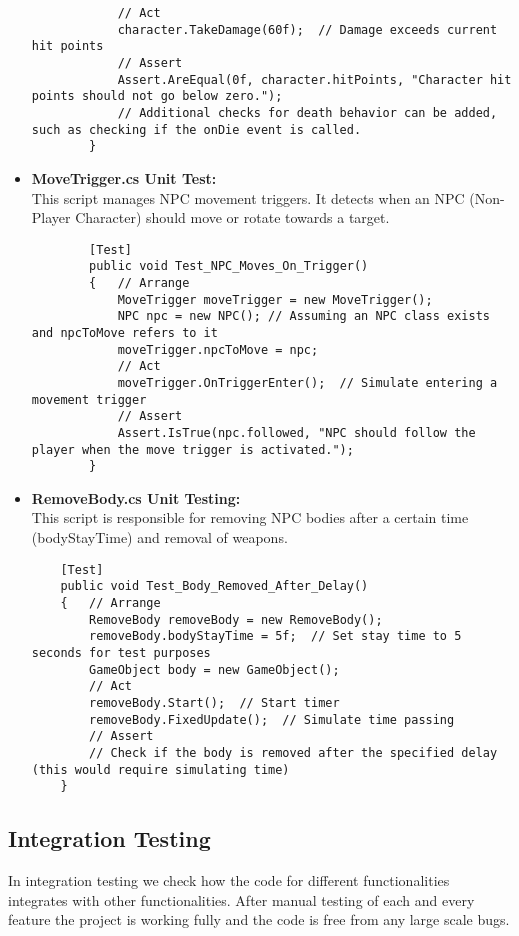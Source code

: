\begin{itemize}
\begin{lstlisting}
			// Act
			character.TakeDamage(60f);  // Damage exceeds current hit points
			// Assert
			Assert.AreEqual(0f, character.hitPoints, "Character hit points should not go below zero.");
			// Additional checks for death behavior can be added, such as checking if the onDie event is called.
		}
	\end{lstlisting}
	\item \textbf{ MoveTrigger.cs Unit Test:}
	\\
	This script manages NPC movement triggers. It detects when an NPC (Non-Player Character) should move or rotate towards a target.
	\begin{lstlisting}
		[Test]
		public void Test_NPC_Moves_On_Trigger()
		{   // Arrange
			MoveTrigger moveTrigger = new MoveTrigger();
			NPC npc = new NPC(); // Assuming an NPC class exists and npcToMove refers to it
			moveTrigger.npcToMove = npc;
			// Act
			moveTrigger.OnTriggerEnter();  // Simulate entering a movement trigger
			// Assert
			Assert.IsTrue(npc.followed, "NPC should follow the player when the move trigger is activated.");
		}
	\end{lstlisting}
	\item \textbf{RemoveBody.cs Unit Testing:}
	\\
	This script is responsible for removing NPC bodies after a certain time (bodyStayTime) and removal of weapons.
	\begin{lstlisting}
	[Test]
	public void Test_Body_Removed_After_Delay()
	{   // Arrange
		RemoveBody removeBody = new RemoveBody();
		removeBody.bodyStayTime = 5f;  // Set stay time to 5 seconds for test purposes
		GameObject body = new GameObject();
		// Act
		removeBody.Start();  // Start timer
		removeBody.FixedUpdate();  // Simulate time passing
		// Assert
		// Check if the body is removed after the specified delay (this would require simulating time)
	}
	\end{lstlisting}
\end{itemize}

\subsection{Integration Testing}
In integration testing we check how the code for different functionalities integrates with other functionalities. After manual testing of each and every feature the project is working fully and the code is free from any large scale bugs.

